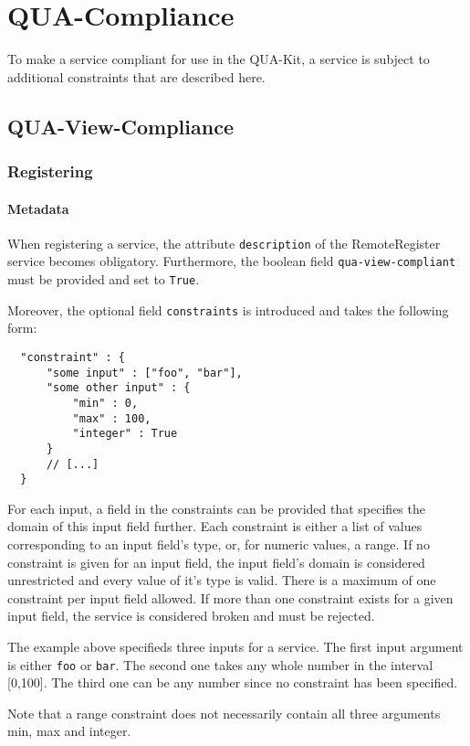 \section{QUA-Compliance}
\label{ch:quacompliance}

To make a service compliant for use in the QUA-Kit, a service is subject to additional constraints that are described here.

\subsection{QUA-View-Compliance}

\subsubsection{Registering}

\paragraph{Metadata}
When registering a service, the attribute \texttt{description} of the RemoteRegister service becomes obligatory. Furthermore, the boolean field \texttt{qua-view-compliant} must be provided and set to \texttt{True}.

Moreover, the optional field \texttt{constraints} is introduced and takes the following form:
\begin{lstlisting}
  "constraint" : {
      "some input" : ["foo", "bar"],
      "some other input" : {
          "min" : 0,
          "max" : 100,
          "integer" : True
      }
      // [...]
  }
\end{lstlisting}
For each input, a field in the constraints can be provided that specifies the domain of this input field further. Each constraint is either a list of values corresponding to an input field's type, or, for numeric values, a range. If no constraint is given for an input field, the input field's domain is considered unrestricted and every value of it's type is valid. There is a maximum of one constraint per input field allowed. If more than one constraint exists for a given input field, the service is considered broken and must be rejected.

The example above specifieds three inputs for a service. The first input argument is either \texttt{foo} or \texttt{bar}. The second one takes any whole number in the interval [0,100]. The third one can be any number since no constraint has been specified.

Note that a range constraint does not necessarily contain all three arguments min, max and integer.

